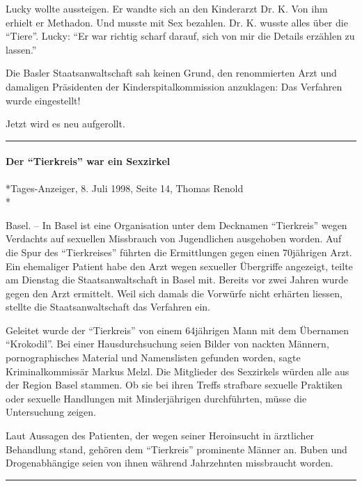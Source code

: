 Lucky wollte aussteigen. Er wandte sich an den Kinderarzt Dr. K. Von ihm
erhielt er Methadon. Und musste mit Sex bezahlen. Dr. K. wusste alles
über die ``Tiere''. Lucky: ``Er war richtig scharf darauf, sich von mir
die Details erzählen zu lassen.''

Die Basler Staatsanwaltschaft sah keinen Grund, den renommierten Arzt
und damaligen Präsidenten der Kinderspitalkommission anzuklagen: Das
Verfahren wurde eingestellt!

Jetzt wird es neu aufgerollt.

\begin{center}\rule{0.5\linewidth}{\linethickness}\end{center}

\hypertarget{der-tierkreis-war-ein-sexzirkel}{%
\paragraph{Der ``Tierkreis'' war ein
Sexzirkel}\label{der-tierkreis-war-ein-sexzirkel}}

*Tages-Anzeiger, 8. Juli 1998, Seite 14, Thomas Renold\\
*

Basel. -- In Basel ist eine Organisation unter dem Decknamen
``Tierkreis'' wegen Verdachts auf sexuellen Missbrauch von Jugendlichen
ausgehoben worden. Auf die Spur des ``Tierkreises'' führten die
Ermittlungen gegen einen 70jährigen Arzt. Ein ehemaliger Patient habe
den Arzt wegen sexueller Übergriffe angezeigt, teilte am Dienstag die
Staatsanwaltschaft in Basel mit. Bereits vor zwei Jahren wurde gegen den
Arzt er­mit­telt. Weil sich damals die Vorwürfe nicht erhärten liessen,
stellte die Staatsanwaltschaft das Verfahren ein.

Geleitet wurde der ``Tierkreis'' von einem 64jährigen Mann mit dem
Übernamen ``Krokodil''. Bei einer Hausdurchsuchung seien Bilder von
nackten Männern, pornographisches Material und Namenslisten gefunden
worden, sagte Kriminalkommissär Markus Melzl. Die Mitglieder des
Sexzirkels würden alle aus der Region Basel stammen. Ob sie bei ihren
Treffs strafbare sexuelle Praktiken oder sexuelle Handlungen mit
Minderjährigen durchführten, müsse die Untersuchung zeigen.

Laut Aussagen des Patienten, der wegen seiner Heroinsucht in ärztlicher
Behandlung stand, gehören dem ``Tierkreis'' prominente Männer an. Buben
und Drogenabhängige seien von ihnen während Jahrzehnten missbraucht
worden.

\begin{center}\rule{0.5\linewidth}{\linethickness}\end{center}

